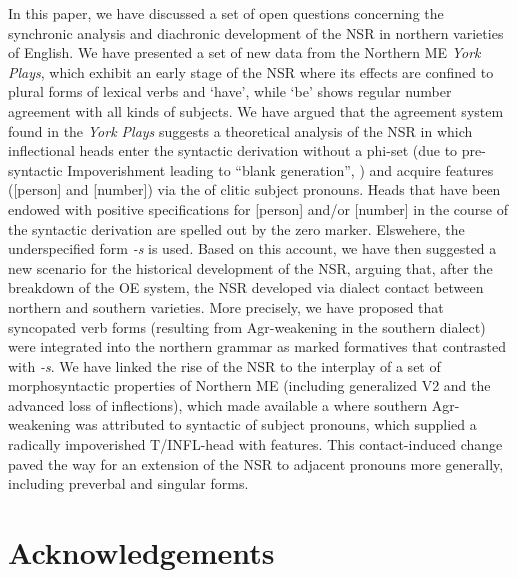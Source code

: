 \documentclass[output=paper]{langsci/langscibook}
\begin{document}
In this paper, we have discussed a set of open questions concerning the
synchronic analysis and diachronic development of the \gls{NSR} in northern varieties
of English. We have presented a set of new data from the Northern ME
\emph{York Plays}, which exhibit an early stage of the \gls{NSR} where its effects
are confined to plural forms of lexical verbs and `have', while `be' shows
regular number agreement with all kinds of subjects. We have argued that the
agreement system found in the \emph{York Plays} suggests a theoretical
analysis of the \gls{NSR} in which inflectional heads enter the syntactic derivation
without a phi-set (due to pre-syntactic Impoverishment leading to ``blank
generation'', \citealt{Roberts:2010}) and acquire  features ([person] and
[number]) via the  of clitic subject pronouns. Heads that have
been endowed with positive specifications for [person] and/or [number] in the
course of the syntactic derivation are spelled out by the zero marker.
Elswehere, the underspecified form \emph{-s} is used. Based on this account,
we have then suggested a new scenario for the historical development
of the \gls{NSR}, arguing that, after the breakdown of the \gls{OE}  system, the
\gls{NSR} developed via dialect contact between northern and southern varieties. More
precisely, we have proposed that syncopated verb forms (resulting from
Agr-weakening in the southern dialect) were integrated into the northern
grammar as marked  formatives that contrasted with \emph{-s}. We
have linked the rise of the \gls{NSR} to the interplay of a set of morphosyntactic
properties of Northern \gls{ME} (including generalized V2 and the advanced loss of
inflections), which made available a  where southern Agr-weakening
was attributed to syntactic  of subject pronouns, which supplied a
radically impoverished T/INFL-head with  features.
This contact-induced change paved the way for an extension of the
\gls{NSR} to adjacent pronouns more generally,
including preverbal and singular forms.

\printchapterglossary{}

\section*{Acknowledgements}
\end{document}
